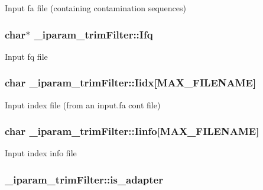Input fa file (containing contamination sequences) \hypertarget{struct__iparam__trimFilter_a5147310738277c148ca7109ba77829ca}{
\subsubsection[{Ifq}]{\setlength{\rightskip}{0pt plus 5cm}char$\ast$ \+\_\+iparam\+\_\+trim\+Filter\+::\+Ifq}}\label{struct__iparam__trimFilter_a5147310738277c148ca7109ba77829ca}
Input fq file \hypertarget{struct__iparam__trimFilter_ae0e1c22a522a0f014952d204e8887607}{
\subsubsection[{Iidx}]{\setlength{\rightskip}{0pt plus 5cm}char \+\_\+iparam\+\_\+trim\+Filter\+::\+Iidx\mbox{[}{\bf M\+A\+X\+\_\+\+F\+I\+L\+E\+N\+A\+M\+E}\mbox{]}}}\label{struct__iparam__trimFilter_ae0e1c22a522a0f014952d204e8887607}
Input index file (from an input.\+fa cont file) \hypertarget{struct__iparam__trimFilter_a76e905e2a809d9a659d49fbd388e0c32}{
\subsubsection[{Iinfo}]{\setlength{\rightskip}{0pt plus 5cm}char \+\_\+iparam\+\_\+trim\+Filter\+::\+Iinfo\mbox{[}{\bf M\+A\+X\+\_\+\+F\+I\+L\+E\+N\+A\+M\+E}\mbox{]}}}\label{struct__iparam__trimFilter_a76e905e2a809d9a659d49fbd388e0c32}
Input index info file \hypertarget{struct__iparam__trimFilter_a6d015b5bf1568c362d9ca0ff37b751f8}{
\subsubsection[{is\+\_\+adapter}]{ \+\_\+iparam\+\_\+trim\+Filter\+::is\+\_\+adapter}}\label{struct__iparam__trimFilter_a6d015b5bf1568c362d9ca0ff37b751f8}
